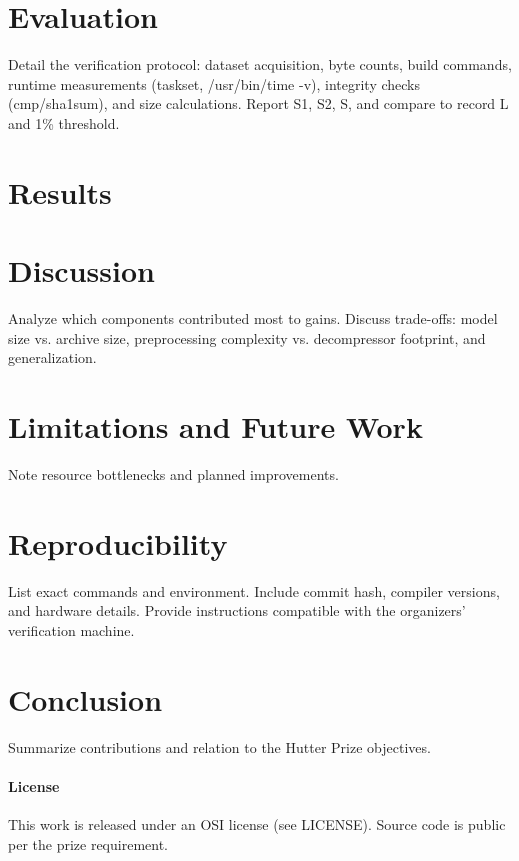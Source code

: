 \documentclass[11pt]{article}
\begin{document}
\section{Evaluation}
Detail the verification protocol: dataset acquisition, byte counts, build commands, runtime measurements (taskset, /usr/bin/time -v), integrity checks (cmp/sha1sum), and size calculations. Report S1, S2, S, and compare to record L and 1\% threshold.

\section{Results}

\section{Discussion}
Analyze which components contributed most to gains. Discuss trade-offs: model size vs. archive size, preprocessing complexity vs. decompressor footprint, and generalization.

\section{Limitations and Future Work}
Note resource bottlenecks and planned improvements.

\section{Reproducibility}
List exact commands and environment. Include commit hash, compiler versions, and hardware details. Provide instructions compatible with the organizers' verification machine.

\section{Conclusion}
Summarize contributions and relation to the Hutter Prize objectives.

\paragraph{License} This work is released under an OSI license (see LICENSE). Source code is public per the prize requirement.
\end{document}
